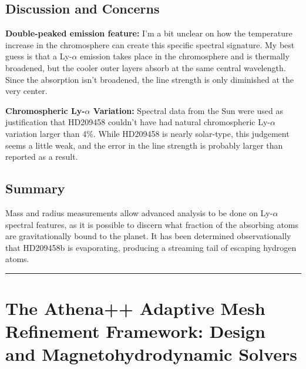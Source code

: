 \documentclass[onecolumn]{aastex63}
\begin{document}
\subsection{Discussion and Concerns}
\textbf{Double-peaked emission feature:} I'm a bit unclear on how the temperature increase in the chromosphere can create this specific spectral signature. My best guess is that a Ly-$\alpha$ emission takes place in the chromosphere and is thermally broadened, but the cooler outer layers absorb at the same central wavelength. Since the absorption isn't broadened, the line strength is only diminished at the very center.

\textbf{Chromospheric Ly-$\alpha$ Variation:} Spectral data from the Sun were used as justification that HD209458 couldn't have had natural chromospheric Ly-$\alpha$ variation larger than 4\%. While HD209458 is nearly solar-type, this judgement seems a little weak, and the error in the line strength is probably larger than reported as a result.


\subsection{Summary}

Mass and radius measurements allow advanced analysis to be done on Ly-$\alpha$ spectral features, as it is possible to discern what fraction of the absorbing atoms are gravitationally bound to the planet. It has been determined observationally that HD209458b is evaporating, producing a streaming tail of escaping hydrogen atoms.



\vspace{1cm}
\hrule
\vspace{1cm}

\section{The Athena++ Adaptive Mesh Refinement Framework: Design and Magnetohydrodynamic Solvers}
\end{document}
